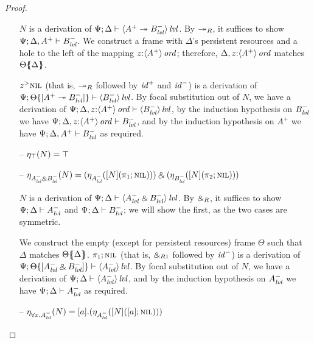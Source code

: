 \begin{proof}
\begin{itemize}
$N$ is a derivation of 
$\foc{\Psi}{\Delta}{\islvl{\susp{A^+ \righti B^-_\mlvl}}}$. By 
${\righti}_R$, it suffices to show $\foc{\Psi}{\Delta, A^+}{B^-_\mlvl}$.
We construct a frame with $\Delta$'s persistent resources and 
a hole to the left of the mapping $z{:}\istrue{\susp{A^+}}$; therefore,
$\mkconj{\Delta}{z{:}\istrue{\susp{A^+}}}$ matches 
$\frameoff{\Theta}{\Delta}$.



$\tappr{z}{\tnil}$ (that is, ${\righti}_R$ followed by ${\it id}^+$ and
${\it id}^-$) is a derivation of 
$\foc{\Psi}{\tackon{\Theta}{[A^+ \righti B^-_\mlvl]}}{\islvl{\susp{B^-_\mlvl}}}$.
By focal substitution out of $N$, we have a derivation of 
$\foc{\Psi}{\Delta, z{:}\istrue{\susp{A^+}}}{\islvl{\susp{B^-_\mlvl}}}$,
by the induction hypothesis on $B^-_\mlvl$ we have
$\foc{\Psi}{\Delta, z{:}\istrue{\susp{A^+}}}{B^-_\mlvl}$, and
by the induction hypothesis on $A^+$ we have
$\foc{\Psi}{\Delta, A^+}{B^-_\mlvl}$ as required.

\smallskip

\item[--] $\etana{N}{\top} = \top$ 
\item[--] $\etana{N}{A^-_\mlvl \with B^-_\mlvl}
           = \twithr
              {(\etana{[N](\tpione{\tnil})}{A^-_\mlvl})}
              {(\etana{[N](\tpitwo{\tnil})}{B^-_\mlvl})}$
\smallskip

$N$ is a derivation of 
$\foc{\Psi}{\Delta}{\islvl{\susp{A^-_\mlvl \with B^-_\mlvl}}}$. By 
$\with_R$, it suffices to show $\foc{\Psi}{\Delta}{A^-_\mlvl}$
and $\foc{\Psi}{\Delta}{B^-_\mlvl}$; we will show the first, as the two
cases are symmetric.
\smallskip

We construct the empty (except for persistent resources) frame
$\Theta$ such that $\Delta$ matches $\frameoff{\Theta}{\Delta}$. 
$\tpione{\tnil}$ (that is, ${\with}_{R1}$ followed by ${\it id}^-$) is
a derivation of 
$\foc{\Psi}{\tackon{\Theta}{[A^-_\mlvl \with B^-_\mlvl]}}
  {\islvl{\susp{A^-_\mlvl}}}$.
By focal substitution out of $N$, we have 
a derivation of $\foc{\Psi}{\Delta}{\islvl{\susp{A^-_\mlvl}}}$, and
by the induction 
hypothesis on $A^-_\mlvl$ we have 
 $\foc{\Psi}{\Delta}{A^-_\mlvl}$ as required.
\smallskip

\item[--] $\etana{N}{\forall x.A^-_\mlvl}
           = \tforallr{a}{(\etana{[N](\tforalll{a}{\tnil})}{A^-_\mlvl})}$

\end{itemize}

\end{proof}

